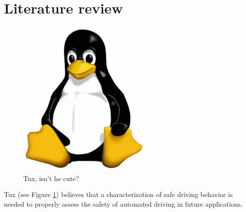 \section{Literature review}
\label{sec:literature review}

\begin{figure}
\includegraphics[width=0.60\linewidth]{figs/tux}
\caption{Tux, isn't he cute?}
\label{fig:tux}
\end{figure}

Tux (see Figure \ref{fig:tux}) believes that a characterization of safe driving behavior \cite{tejada2020safe} is needed to properly assess the safety of automated driving in future applications.

